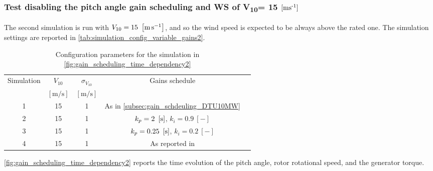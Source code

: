 \subsubsection[$V_{10}=15 \, \mesunt{\meter\per\second}$]{Test disabling the pitch angle gain scheduling and WS of V\textsubscript{10}= 15 $\left[ \text{ms}\textsuperscript{-1} \right]$}
The second simulation is run with $V_{10}=15 \ \left[\si{\meter\per\second}\right]$, and so the wind speed is expected to be always above the rated one. The simulation settings are reported in \autoref{tab:simulation_config_variable_gains2}.
\begin{table}[htb]
  \caption{Configuration parameters for the simulation in \autoref{fig:gain_scheduling_time_dependency2}}
  \centering
  \begin{tabular}{ccccc}
  \toprule
    Simulation & $V_{10}$  & $\sigma_{V_{10}}$ & Gains schedule \\ 
     & $\left[\si{\meter\per\second}\right]$ & $\left[\si{\meter\per\second}\right]$ & \\ \midrule       
     1 & 15 & 1 & As in \autoref{subsec:gain_schdeuling_DTU10MW}  \\
     2 & 15 & 1 & $k_p = 2 \ \mesunt{\second}$, $k_i=0.9 \ [-]$ \\
     3 & 15 & 1 & $k_p = 0.25 \ \mesunt{\second}$, $k_i=0.2 \ [-]$  \\
     4 & 15 & 1 & As reported in \cite{Olimpo_Anaya‐Lara}  \\
     \bottomrule
  \end{tabular}
  \label{tab:simulation_config_variable_gains2}
\end{table}

\autoref{fig:gain_scheduling_time_dependency2} reports the time evolution of the pitch angle, rotor rotational speed, and the generator torque. 


